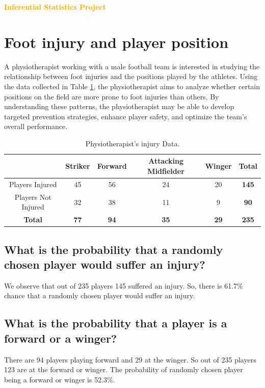 \documentclass[12pt,a4paper]{style}
\begin{document}
	\tableofcontents
	\listoffigures
	\newpage
	\begin{center}
			\textcolor{orange}{\Large {\bf{Inferential Statistics Project}}}
	\end{center}
	
	\section{Foot injury and player position}
A physiotherapist working with a male football team is interested in studying the relationship between foot injuries and the positions played by the athletes. Using the data collected in Table \ref{table1}, the physiotherapist aims to analyze whether certain positions on the field are more prone to foot injuries than others. By understanding these patterns, the physiotherapist may be able to develop targeted prevention strategies, enhance player safety, and optimize the team's overall performance.	
	\begin{table}[h]
		\centering
		\begin{tabular}{|c|cccc|c|}
			\hline
			& Striker     & Forward     & Attacking Midfielder & Winger      & \textbf{Total} \\ \hline
			Players Injured     & 45          & 56          & 24                   & 20          & \textbf{145}   \\
			Players Not Injured & 32          & 38          & 11                   & 9           & \textbf{90}   \\
			\hline
			\textbf{Total}      & \textbf{77} & \textbf{94} & \textbf{35}          & \textbf{29} & \textbf{235}\\
			\hline  
		\end{tabular}
		\caption{Physiotherapist's injury Data.}
		\label{table1}
	\end{table}
	
	\subsection{What is the probability that a randomly chosen player would suffer an injury?} We observe that out of 235 players 145 suffered an injury. So, there is  61.7\% chance that a randomly chosen player would suffer an injury.
	\subsection{What is the probability that a player is a forward or a winger?}
	There are 94 players playing forward and 29 at the winger. So out of 235 players 123 are at the forward or winger. The probability of randomly chosen player being a forward or winger is 52.3\%.  
\end{document}

